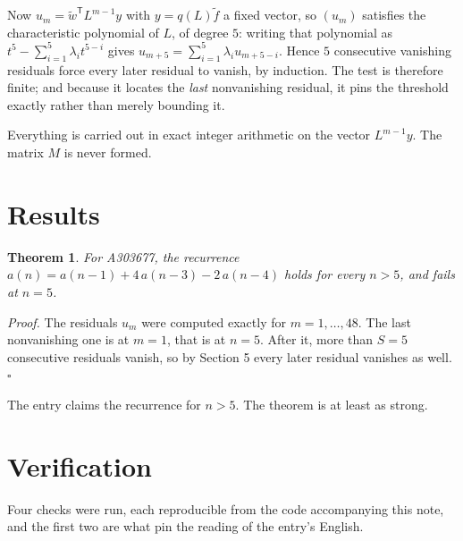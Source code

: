 \documentclass[11pt]{article}
\newtheorem{theorem}{Theorem}
\theoremstyle{definition}
\begin{document}
Now $u_m = \tilde w^{\mathsf T} L^{m-1} y$ with $y = q(L)\tilde f$ a fixed vector, so $(u_m)$ satisfies the characteristic polynomial of $L$, of degree $5$: writing that polynomial as $t^{5} - \sum_{i=1}^{5} \lambda_i t^{5-i}$ gives $u_{m+5} = \sum_{i=1}^{5} \lambda_i u_{m+5-i}$. Hence $5$ consecutive vanishing residuals force every later residual to vanish, by induction. The test is therefore finite; and because it locates the {\itshape last} nonvanishing residual, it pins the threshold exactly rather than merely bounding it.

Everything is carried out in exact integer arithmetic on the vector $L^{m-1}y$. The matrix $M$ is never formed.

\section{Results}

\begin{theorem} For A303677, the recurrence $a(n) = a(n-1) + 4\,a(n-3) - 2\,a(n-4)$ holds for every $n > 5$, and fails at $n = 5$.\end{theorem}

{\itshape Proof.} The residuals $u_m$ were computed exactly for $m = 1,\dots,48$. The last nonvanishing one is at $m = 1$, that is at $n = 5$. After it, more than $S = 5$ consecutive residuals vanish, so by Section 5 every later residual vanishes as well. $\square$

The entry claims the recurrence for $n > 5$. The theorem is at least as strong.

\section{Verification}

Four checks were run, each reproducible from the code accompanying this note, and the first two are what pin the reading of the entry's English.
\end{document}
